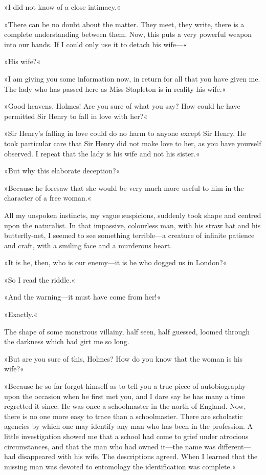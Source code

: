 »I did not know of a close intimacy.«

»There can be no doubt about the matter. They meet, they write, there is a complete understanding between them. Now, this puts a very powerful weapon into our hands. If I could only use it to detach his wife\allowbreak---\allowbreak \longdash «

»His wife?«

»I am giving you some information now, in return for all that you have given me. The lady who has passed here as Miss Stapleton is in reality his wife.«

»Good heavens, Holmes! Are you sure of what you say? How could he have permitted Sir Henry to fall in love with her?«

»Sir Henry's falling in love could do no harm to anyone except Sir Henry. He took particular care that Sir Henry did not make love to her, as you have yourself observed. I repeat that the lady is his wife and not his sister.«

»But why this elaborate deception?«

»Because he foresaw that she would be very much more useful to him in the character of a free woman.«

All my unspoken instincts, my vague suspicions, suddenly took shape and centred upon the naturalist. In that impassive, colourless man, with his straw hat and his butterfly-net, I seemed to see something terrible\allowbreak---\allowbreak a creature of infinite patience and craft, with a smiling face and a murderous heart.

»It is he, then, who is our enemy\allowbreak---\allowbreak it is he who dogged us in London?«

»So I read the riddle.«

»And the warning\allowbreak---\allowbreak it must have come from her!«

»Exactly.«

The shape of some monstrous villainy, half seen, half guessed, loomed through the darkness which had girt me so long.

»But are you sure of this, Holmes? How do you know that the woman is his wife?«

»Because he so far forgot himself as to tell you a true piece of autobiography upon the occasion when he first met you, and I dare say he has many a time regretted it since. He was once a schoolmaster in the north of England. Now, there is no one more easy to trace than a schoolmaster. There are scholastic agencies by which one may identify any man who has been in the profession. A little investigation showed me that a school had come to grief under atrocious circumstances, and that the man who had owned it\allowbreak---\allowbreak the name was different\allowbreak---\allowbreak had disappeared with his wife. The descriptions agreed. When I learned that the missing man was devoted to entomology the identification was complete.«


